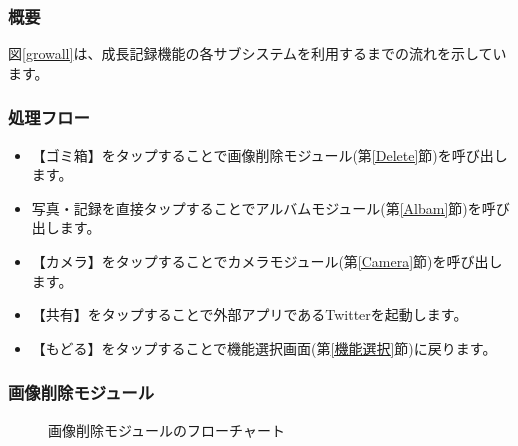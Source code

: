\documentclass[a4j]{jarticle}
\begin{document}
\subsubsection*{概要}
図\ref{growall}は、成長記録機能の各サブシステムを利用するまでの流れを示しています。

\subsubsection*{処理フロー}
\begin{itemize}
\item 【ゴミ箱】をタップすることで画像削除モジュール(第\ref{Delete}節)を呼び出します。

\item 写真・記録を直接タップすることでアルバムモジュール(第\ref{Albam}節)を呼び出します。

\item 【カメラ】をタップすることでカメラモジュール(第\ref{Camera}節)を呼び出します。

\item 【共有】をタップすることで外部アプリであるTwitterを起動します。

\item 【もどる】をタップすることで機能選択画面(第\ref{機能選択}節)に戻ります。
\end{itemize}

\subsubsection{画像削除モジュール\label{Delete}}
\begin{figure}[H]
    \begin{center}
    \caption {画像削除モジュールのフローチャート}
    \label{delete}
    \end{center}
\end{figure}
\end{document}
